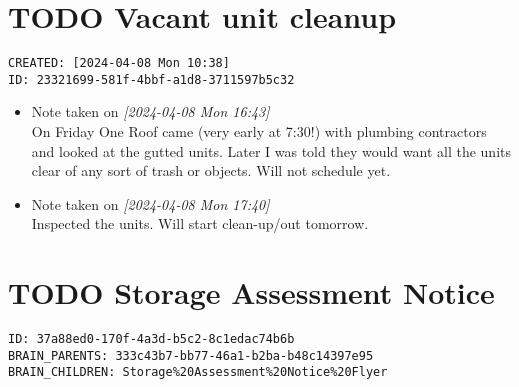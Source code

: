 \documentclass[letterpaper]{article}
\date{2024-04-08T16:16:27}
\title{}
\begin{document}
\section*{{\bfseries\sffamily TODO} Vacant unit cleanup}
\label{sec:org2dc1f56}
\begin{verbatim}
CREATED: [2024-04-08 Mon 10:38]
ID: 23321699-581f-4bbf-a1d8-3711597b5c32
\end{verbatim}
\begin{itemize}
\item Note taken on \textit{[2024-04-08 Mon 16:43] } \\[0pt]
On Friday One Roof came (very early at 7:30!) with plumbing
contractors and looked at the gutted units. Later I was told they
would want all the units clear of any sort of trash or objects. Will
not schedule yet.
\item Note taken on \textit{[2024-04-08 Mon 17:40] } \\[0pt]
Inspected the units. Will start clean-up/out tomorrow.
\end{itemize}




\section*{{\bfseries\sffamily TODO} Storage Assessment Notice}
\label{sec:orgde0f8b8}
\begin{verbatim}
ID: 37a88ed0-170f-4a3d-b5c2-8c1edac74b6b
BRAIN_PARENTS: 333c43b7-bb77-46a1-b2ba-b48c14397e95
BRAIN_CHILDREN: Storage%20Assessment%20Notice%20Flyer
\end{verbatim}
\end{document}
